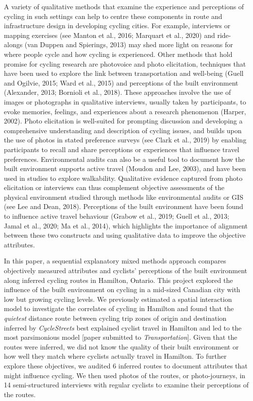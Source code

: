 \documentclass[]{elsarticle} %
\begin{document}
A variety of qualitative methods that examine the experience and
perceptions of cycling in such settings can help to centre these
components in route and infrastructure design in developing cycling
cities. For example, interviews or mapping exercises (see Manton et al.,
2016; Marquart et al., 2020) and ride-alongs (van Duppen and Spierings,
2013) may shed more light on reasons for where people cycle and how
cycling is experienced. Other methods that hold promise for cycling
research are photovoice and photo elicitation, techniques that have been
used to explore the link between transportation and well-being (Guell
and Ogilvie, 2015; Ward et al., 2015) and perceptions of the built
environment (Alexander, 2013; Bornioli et al., 2018). These approaches
involve the use of images or photographs in qualitative interviews,
usually taken by participants, to evoke memories, feelings, and
experiences about a research phenomenon (Harper, 2002). Photo
elicitation is well-suited for prompting discussion and developing a
comprehensive understanding and description of cycling issues, and
builds upon the use of photos in stated preference surveys (see Clark et
al., 2019) by enabling participants to recall and share perceptions or
experiences that influence travel preferences. Environmental audits can
also be a useful tool to document how the built environment supports
active travel (Moudon and Lee, 2003), and have been used in studies to
explore walkability. Qualitative evidence captured from photo
elicitation or interviews can thus complement objective assessments of
the physical environment studied through methods like environmental
audits or GIS (see Lee and Dean, 2018). Perceptions of the built
environment have been found to influence active travel behaviour (Grabow
et al., 2019; Guell et al., 2013; Jamal et al., 2020; Ma et al., 2014),
which highlights the importance of alignment between these two
constructs and using qualitative data to improve the objective
attributes.

In this paper, a sequential explanatory mixed methods approach compares
objectively measured attributes and cyclists' perceptions of the built
environment along inferred cycling routes in Hamilton, Ontario. This
project explored the influence of the built environment on cycling in a
mid-sized Canadian city with low but growing cycling levels. We
previously estimated a spatial interaction model to investigate the
correlates of cycling in Hamilton and found that the \emph{quietest}
distance route between cycling trip zones of origin and destination
inferred by \emph{CycleStreets} best explained cyclist travel in
Hamilton and led to the most parsimonious model {[}paper submitted to
\emph{Transportation}{]}. Given that the routes were inferred, we did
not know the quality of their built environment or how well they match
where cyclists actually travel in Hamilton. To further explore these
objectives, we audited 6 inferred routes to document attributes that
might influence cycling. We then used photos of the routes, or
photo-journeys, in 14 semi-structured interviews with regular cyclists
to examine their perceptions of the routes.
\end{document}
